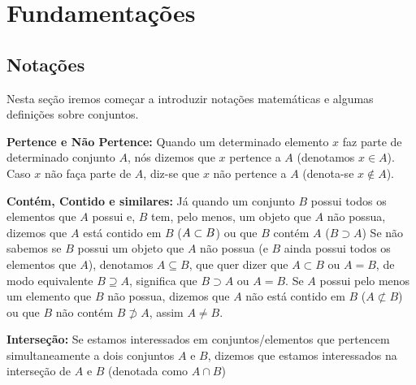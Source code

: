     \section{Fundamentações}
    \subsection{Notações}
    Nesta seção iremos começar a introduzir notações matemáticas e algumas definições sobre conjuntos.
    
    \textbf{Pertence e Não Pertence:} Quando um determinado elemento $x$ faz parte de determinado conjunto $A$, nós dizemos que $x$ pertence a $A$ (denotamos $x \in A$). Caso $x$ não faça parte de $A$, diz-se que $x$ não pertence a $A$ (denota-se  $x \notin A$).
    
    \textbf{Contém, Contido e similares:} Já quando um conjunto $B$ possui todos os elementos que $A$ possui e, $B$ tem, pelo menos, um objeto que $A$ não possua, dizemos que $A$ está contido em $B$ ($\space A \subset B$) ou que $B$ contém $A$ ($B \supset A$)%
    Se não sabemos se $B$ possui um objeto que $A$ não possua (e $B$ ainda possui todos os elementos que $A$), denotamos $A \subseteq B$, que quer dizer que $A \subset B$ ou $A=B$, de modo equivalente $B \supseteq A$, significa que $B \supset A$ ou $A=B$. Se $A$ possui pelo menos um elemento que $B$ não possua, dizemos que $A$ não está contido em $B$ ($A \not\subset B$) ou que $B$ não contém $B\not\supset A$, assim $A \neq B$. 
    

    \textbf{Interseção:} Se estamos interessados em conjuntos/elementos que pertencem simultaneamente a dois conjuntos $A$ e $B$, dizemos que estamos interessados na interseção de $A$ e $B$ (denotada como $A \cap B$)%
    
    

